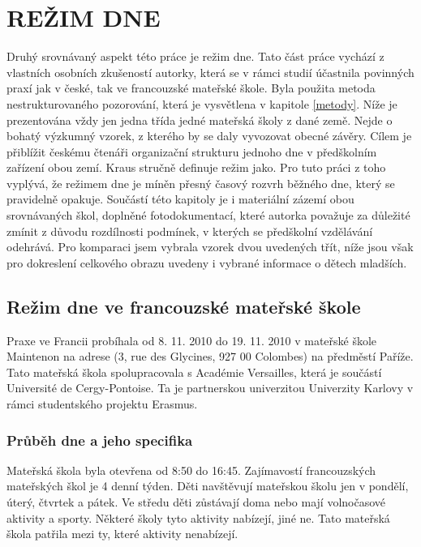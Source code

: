 \chapter{REŽIM DNE}
\label{rezim}

	Druhý srovnávaný aspekt této práce je režim dne. Tato část práce vychází z vlastních osobních zkušeností autorky, která se v rámci studií účastnila povinných praxí jak v české, tak ve francouzské mateřské škole. Byla použita metoda nestrukturovaného pozorování, která je vysvětlena v kapitole \ref{metody}. Níže je prezentována vždy jen jedna třída jedné mateřská školy z dané země. Nejde o bohatý výzkumný vzorek, z kterého by se daly vyvozovat obecné závěry. Cílem je přiblížit českému čtenáři organizační strukturu jednoho dne v předškolním zařízení obou zemí. Kraus stručně definuje režim jako\textit{}. \citep[s.~700]{Kraus}
	Pro tuto práci z toho vyplývá, že režimem dne je míněn přesný časový rozvrh běžného dne, který se pravidelně opakuje.
	Součástí této kapitoly je i materiální zázemí obou srovnávaných škol, doplněné fotodokumentací, které autorka považuje za důležité zmínit z důvodu rozdílnosti podmínek, v kterých se předškolní vzdělávání odehrává.
	Pro komparaci jsem vybrala vzorek dvou uvedených třít, níže jsou však pro dokreslení celkového obrazu uvedeny i vybrané informace o dětech mladších.

	\section{Režim dne ve francouzské mateřské škole}

		Praxe ve Francii probíhala od 8. 11. 2010 do 19. 11. 2010 v mateřské škole Maintenon na adrese (3, rue des Glycines, 927 00 Colombes) na předměstí Paříže. Tato mateřská škola spolupracovala s Académie Versailles, která je součástí Université de Cergy-Pontoise. Ta je partnerskou univerzitou Univerzity Karlovy v rámci studentského projektu Erasmus. 


		\subsection{Průběh dne a jeho specifika}

			Mateřská škola byla otevřena od 8:50 do 16:45. Zajímavostí francouzských mateřských škol je 4 denní týden. Děti navštěvují mateřskou školu jen v pondělí, úterý, čtvrtek a pátek. Ve středu děti zůstávají doma nebo mají volnočasové aktivity a sporty. Některé školy tyto aktivity nabízejí, jiné ne. Tato mateřská škola patřila mezi ty, které aktivity nenabízejí. 
			
